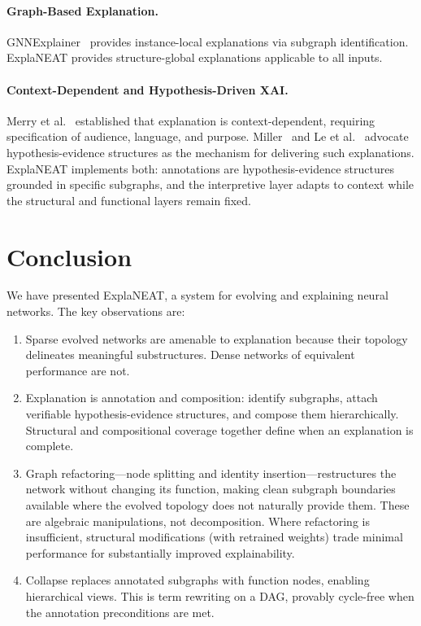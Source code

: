\documentclass[11pt]{article}
\begin{document}
\paragraph{Graph-Based Explanation.} GNNExplainer~\cite{ying2019gnnexplainer} provides instance-local explanations via subgraph identification. ExplaNEAT provides structure-global explanations applicable to all inputs.

\paragraph{Context-Dependent and Hypothesis-Driven XAI.} Merry et al.~\cite{merry2021mental} established that explanation is context-dependent, requiring specification of audience, language, and purpose. Miller~\cite{miller2023evaluative} and Le et al.~\cite{le2024evaluative} advocate hypothesis-evidence structures as the mechanism for delivering such explanations. ExplaNEAT implements both: annotations are hypothesis-evidence structures grounded in specific subgraphs, and the interpretive layer adapts to context while the structural and functional layers remain fixed.


\section{Conclusion}
\label{sec:conclusion}

We have presented ExplaNEAT, a system for evolving and explaining neural networks. The key observations are:

\begin{enumerate}
    \item Sparse evolved networks are amenable to explanation because their topology delineates meaningful substructures. Dense networks of equivalent performance are not.

    \item Explanation is annotation and composition: identify subgraphs, attach verifiable hypothesis-evidence structures, and compose them hierarchically. Structural and compositional coverage together define when an explanation is complete.

    \item Graph refactoring---node splitting and identity insertion---restructures the network without changing its function, making clean subgraph boundaries available where the evolved topology does not naturally provide them. These are algebraic manipulations, not decomposition. Where refactoring is insufficient, structural modifications (with retrained weights) trade minimal performance for substantially improved explainability.

    \item Collapse replaces annotated subgraphs with function nodes, enabling hierarchical views. This is term rewriting on a DAG, provably cycle-free when the annotation preconditions are met.
\end{enumerate}
\end{document}
